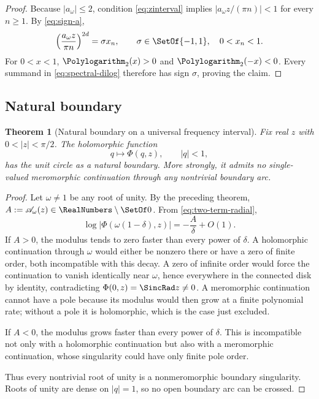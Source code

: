 \documentclass[11pt]{article}
\newtheorem{theorem}{Theorem}[section]
\theoremstyle{definition}
\newcommand{\Aact}{\mathscr A}
\begin{document}
\begin{proof}
Because $|a_\omega|\le2$, condition \cref{eq:zinterval} implies
\(
 |a_\omega z/(\pi n)|<1
\) for every $n\ge1$.  By \cref{eq:sign-a},
\[
 \left(\frac{a_\omega z}{\pi n}\right)^{2d}
 =\sigma x_n,
 \qquad
 \sigma\in\SetOf{-1,1},\quad 0<x_n<1.
\]
For $0<x<1$, $\Polylogarithm_2(x)>0$ and $\Polylogarithm_2(-x)<0$.  Every summand in \cref{eq:spectral-dilog} therefore has sign $\sigma$, proving the claim.
\end{proof}

\subsection{Natural boundary}

\begin{theorem}[Natural boundary on a universal frequency interval]
Fix real $z$ with $0<|z|<\pi/2$.  The holomorphic function
\begin{equation}
 q\longmapsto\Phi(q,z),\qquad |q|<1,
 \label{eq:qmap}
\end{equation}
has the unit circle as a natural boundary.  More strongly, it admits no single-valued meromorphic continuation through any nontrivial boundary arc.
\end{theorem}

\begin{proof}
Let $\omega\ne1$ be any root of unity.  By the preceding theorem,
\(
 A:=\Aact_\omega(z)\in\RealNumbers\setminus\SetOf0
\).  From \cref{eq:two-term-radial},
\begin{equation}
 \log|\Phi(\omega(1-\delta),z)|
 =-\frac{A}{\delta}+O(1).
 \label{eq:mod-growth}
\end{equation}
If $A>0$, the modulus tends to zero faster than every power of $\delta$.  A holomorphic continuation through $\omega$ would either be nonzero there or have a zero of finite order, both incompatible with this decay.  A zero of infinite order would force the continuation to vanish identically near $\omega$, hence everywhere in the connected disk by identity, contradicting $\Phi(0,z)=\SincRad z\ne0$.  A meromorphic continuation cannot have a pole because its modulus would then grow at a finite polynomial rate; without a pole it is holomorphic, which is the case just excluded.

If $A<0$, the modulus grows faster than every power of $\delta$.  This is incompatible not only with a holomorphic continuation but also with a meromorphic continuation, whose singularity could have only finite pole order.

Thus every nontrivial root of unity is a nonmeromorphic boundary singularity.  Roots of unity are dense on $|q|=1$, so no open boundary arc can be crossed.
\end{proof}
\end{document}
